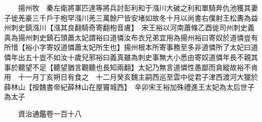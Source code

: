 　　揚州牧　秦左衛將軍匹達等將兵討彭利和于漒川大破之利和單騎奔仇池獲其妻子徙羌豪三千戶于枹罕漒川羌三萬餘尸皆安堵如故冬十月以尚書右僕射王松夀為益州刺史鎮漒川【漒其良翻騎奇寄翻枹音膚】　宋王裕以河南蕭條乙酉徙司州刺史義真為揚州刺史鎮石頭蕭太妃謂裕曰道憐汝布衣兄弟宜用為揚州裕曰寄奴於道憐豈有所惜【裕小字寄奴道憐蕭太妃所生也】揚州根本所寄事務至多非道憐所了太妃曰道憐年出五十豈不如汝十歲兒邪裕曰義真雖為刺史事無大小悉由寄奴道憐年長不親其事於聽望不足【聽望猶言觀聽也長知兩翻】太妃乃無言道憐性愚鄙而貪縱故裕不肯用　十一月丁亥朔日有食之　十二月癸亥魏主嗣西巡至雲中從君子津西渡河大獵於薛林山【按魏書帝紀薛林山在屋竇城西】　辛卯宋王裕加殊禮進王太妃為太后世子為太子

　　資治通鑑卷一百十八  
    


 


 



 

 
  







 


　　
　　
　
　
　


　　

　















	
	









































 
  



















 





 












  
  
  

 





